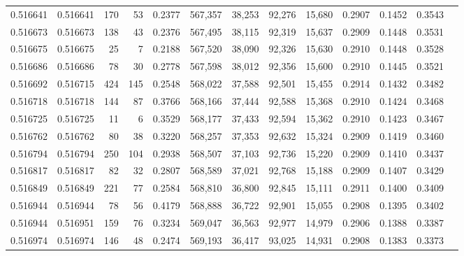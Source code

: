 \begin{tabular}{rrrrrrrrrrrrr}
0.516641 & 0.516641 &   170 &    53 &                                     0.2377 & 567,357 &  38,253 &  92,276 &  15,680 & 0.2907 & 0.1452 & 0.3543 \\
0.516673 & 0.516673 &   138 &    43 &                                     0.2376 & 567,495 &  38,115 &  92,319 &  15,637 & 0.2909 & 0.1448 & 0.3531 \\
0.516675 & 0.516675 &    25 &     7 &                                     0.2188 & 567,520 &  38,090 &  92,326 &  15,630 & 0.2910 & 0.1448 & 0.3528 \\
0.516686 & 0.516686 &    78 &    30 &                                     0.2778 & 567,598 &  38,012 &  92,356 &  15,600 & 0.2910 & 0.1445 & 0.3521 \\
0.516692 & 0.516715 &   424 &   145 &                                     0.2548 & 568,022 &  37,588 &  92,501 &  15,455 & 0.2914 & 0.1432 & 0.3482 \\
0.516718 & 0.516718 &   144 &    87 &                                     0.3766 & 568,166 &  37,444 &  92,588 &  15,368 & 0.2910 & 0.1424 & 0.3468 \\
0.516725 & 0.516725 &    11 &     6 &                                     0.3529 & 568,177 &  37,433 &  92,594 &  15,362 & 0.2910 & 0.1423 & 0.3467 \\
0.516762 & 0.516762 &    80 &    38 &                                     0.3220 & 568,257 &  37,353 &  92,632 &  15,324 & 0.2909 & 0.1419 & 0.3460 \\
0.516794 & 0.516794 &   250 &   104 &                                     0.2938 & 568,507 &  37,103 &  92,736 &  15,220 & 0.2909 & 0.1410 & 0.3437 \\
0.516817 & 0.516817 &    82 &    32 &                                     0.2807 & 568,589 &  37,021 &  92,768 &  15,188 & 0.2909 & 0.1407 & 0.3429 \\
0.516849 & 0.516849 &   221 &    77 &                                     0.2584 & 568,810 &  36,800 &  92,845 &  15,111 & 0.2911 & 0.1400 & 0.3409 \\
0.516944 & 0.516944 &    78 &    56 &                                     0.4179 & 568,888 &  36,722 &  92,901 &  15,055 & 0.2908 & 0.1395 & 0.3402 \\
0.516944 & 0.516951 &   159 &    76 &                                     0.3234 & 569,047 &  36,563 &  92,977 &  14,979 & 0.2906 & 0.1388 & 0.3387 \\
0.516974 & 0.516974 &   146 &    48 &                                     0.2474 & 569,193 &  36,417 &  93,025 &  14,931 & 0.2908 & 0.1383 & 0.3373 \\

\end{tabular}
